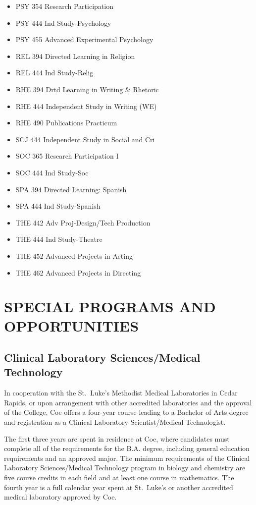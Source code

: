 \documentclass[
  letterpaper,
]{scrbook}
\begin{document}
\begin{itemize}
\item
  PSY 354 Research Participation
\item
  PSY 444 Ind Study-Psychology
\item
  PSY 455 Advanced Experimental Psychology
\item
  REL 394 Directed Learning in Religion
\item
  REL 444 Ind Study-Relig
\item
  RHE 394 Drtd Learning in Writing \& Rhetoric
\item
  RHE 444 Independent Study in Writing (WE)
\item
  RHE 490 Publications Practicum
\item
  SCJ 444 Independent Study in Social and Cri
\item
  SOC 365 Research Participation I
\item
  SOC 444 Ind Study-Soc
\item
  SPA 394 Directed Learning: Spanish
\item
  SPA 444 Ind Study-Spanish
\item
  THE 442 Adv Proj-Design/Tech Production
\item
  THE 444 Ind Study-Theatre
\item
  THE 452 Advanced Projects in Acting
\item
  THE 462 Advanced Projects in Directing
\end{itemize}

\chapter{SPECIAL PROGRAMS AND
OPPORTUNITIES}\label{special-programs-and-opportunities}

\section{Clinical Laboratory Sciences/Medical
Technology}\label{clinical-laboratory-sciencesmedical-technology}

In cooperation with the St.~Luke's Methodist Medical Laboratories in
Cedar Rapids, or upon arrangement with other accredited laboratories and
the approval of the College, Coe offers a four-year course leading to a
Bachelor of Arts degree and registration as a Clinical Laboratory
Scientist/Medical Technologist.

The first three years are spent in residence at Coe, where candidates
must complete all of the requirements for the B.A. degree, including
general education requirements and an approved major. The minimum
requirements of the Clinical Laboratory Sciences/Medical Technology
program in biology and chemistry are five course credits in each field
and at least one course in mathematics. The fourth year is a full
calendar year spent at St.~Luke's or another accredited medical
laboratory approved by Coe.
\end{document}
